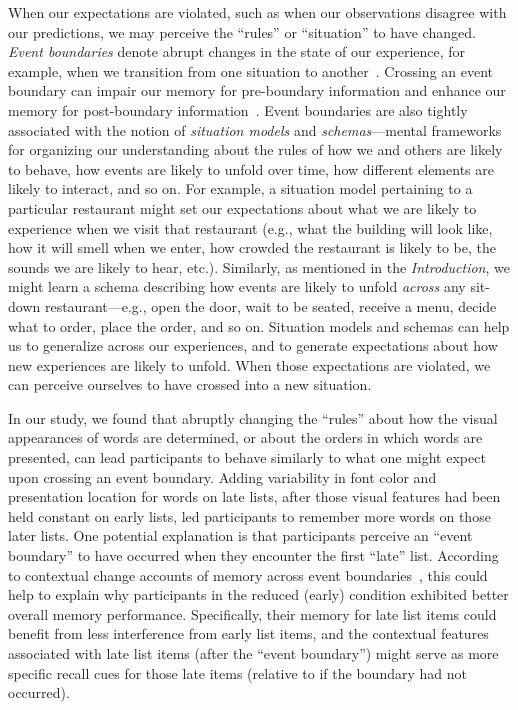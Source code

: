 \documentclass[11pt]{article}
\begin{document}
When our expectations are violated, such as when our observations disagree with
our predictions, we may perceive the ``rules'' or ``situation'' to have
changed. \textit{Event boundaries} denote abrupt changes in the state of our
experience, for example, when we transition from one situation to
another~\citep{RadvZack17, ZwaaRadv98}. Crossing an event boundary can impair
our memory for pre-boundary information and enhance our memory for
post-boundary information~\citep{RadvCope06, SahaKell02, MannEtal16,
DuBrDava13}. Event boundaries are also tightly associated with the notion of
\textit{situation models} and \textit{schemas}---mental frameworks for
organizing our understanding about the rules of how we and others are likely to
behave, how events are likely to unfold over time, how different elements are
likely to interact, and so on. For example, a situation model pertaining to a
particular restaurant might set our expectations about what we are likely to
experience when we visit that restaurant (e.g., what the building will look
like, how it will smell when we enter, how crowded the restaurant is likely to
be, the sounds we are likely to hear, etc.). Similarly, as mentioned in the
\textit{Introduction}, we might learn a schema describing how events are likely
to unfold \textit{across} any sit-down restaurant---e.g., open the door, wait
to be seated, receive a menu, decide what to order, place the order, and so on.
Situation models and schemas can help us to generalize across our experiences,
and to generate expectations about how new experiences are likely to unfold.
When those expectations are violated, we can perceive ourselves to have crossed
into a new situation.

In our study, we found that abruptly changing the ``rules'' about how the
visual appearances of words are determined, or about the orders in which words
are presented, can lead participants to behave similarly to what one might
expect upon crossing an event boundary. Adding variability in font color and
presentation location for words on late lists, after those visual features had
been held constant on early lists, led participants to remember more words on
those later lists. One potential explanation is that participants perceive an
``event boundary'' to have occurred when they encounter the first ``late''
list. According to contextual change accounts of memory across event
boundaries~\citep[e.g.,][]{SahaKell02, PettEtal16, GoldEtal17, FlorEtal17},
this could help to explain why participants in the reduced (early) condition
exhibited better overall memory performance. Specifically, their memory for
late list items could benefit from less interference from early list items, and
the contextual features associated with late list items (after the ``event
boundary'') might serve as more specific recall cues for those late items
(relative to if the boundary had not occurred).
\end{document}
